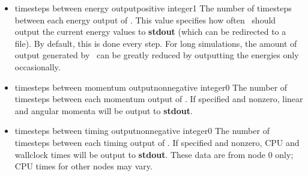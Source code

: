 \begin{itemize}
\item
{}%
{timesteps between energy output}{positive integer}{1}%
{%
The number of timesteps between each energy output of \NAMD.  
This value
specifies how often \NAMD\ should output the current energy 
values to {\bf stdout} (which can be redirected to a file).  
By default, this is done every step.  
For long simulations, 
the amount of output generated by \NAMD\ can be greatly reduced 
by outputting the energies only occasionally.  
}

\item
{}%
{timesteps between momentum output}{nonnegative integer}{0}%
{%
The number of timesteps between each momentum output of \NAMD.
If specified and nonzero, linear and angular momenta will be
output to {\bf stdout}.
}

\item
{}%
{timesteps between timing output}{nonnegative integer}{0}%
{%
The number of timesteps between each timing output of \NAMD.
If specified and nonzero, CPU and wallclock times will be
output to {\bf stdout}.
These data are from node 0 only; CPU times for other nodes
may vary.
}

\end{itemize}

